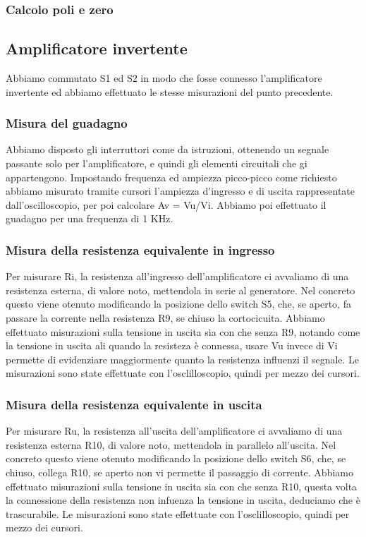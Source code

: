 \documentclass[a4paper]{article}
\begin{document}
				\subsubsection{Calcolo poli e zero}
		\subsection{Amplificatore invertente}
			Abbiamo commutato S1 ed S2 in modo che fosse connesso l'amplificatore invertente ed abbiamo effettuato le stesse misurazioni del punto precedente.
			\subsubsection{Misura del guadagno}
				Abbiamo disposto gli interruttori come da istruzioni, ottenendo un segnale passante solo per l'amplificatore, e quindi gli elementi circuitali che gi appartengono. %
				Impostando frequenza ed ampiezza picco-picco come richiesto abbiamo misurato tramite cursori l'ampiezza d'ingresso e di uscita rappresentate dall'oscilloscopio, per poi calcolare Av = Vu/Vi.
				Abbiamo poi effettuato il guadagno per una frequenza di 1 KHz.
			\subsubsection{Misura della resistenza equivalente in ingresso}	
				Per misurare Ri, la resistenza all'ingresso dell'amplificatore ci avvaliamo di una resistenza esterna, di valore noto, mettendola in serie al generatore.
				Nel concreto questo viene otenuto modificando la  posizione dello switch S5, che, se aperto, fa passare la corrente nella resistenza R9, se chiuso la cortocicuita.
				Abbiamo effettuato misurazioni sulla tensione in uscita sia con che senza R9, notando come la tensione in uscita ali quando la resisteza è connessa, usare Vu invece di Vi permette di evidenziare maggiormente quanto la resistenza influenzi il segnale. %
				Le misurazioni sono state effettuate con l'osclilloscopio, quindi per mezzo dei cursori.
			\subsubsection{Misura della resistenza equivalente in uscita}	
				Per misurare Ru, la resistenza all'uscita dell'amplificatore ci avvaliamo di una resistenza esterna R10, di valore noto, mettendola in parallelo all'uscita.
				Nel concreto questo viene otenuto modificando la  posizione dello switch S6, che, se chiuso, collega R10, se aperto non vi permette il passaggio di corrente.
				Abbiamo effettuato misurazioni sulla tensione in uscita sia con che senza R10, questa volta la connessione della resistenza non infuenza la tensione in uscita, deduciamo che è trascurabile. %
				Le misurazioni sono state effettuate con l'osclilloscopio, quindi per mezzo dei cursori.
\end{document}
